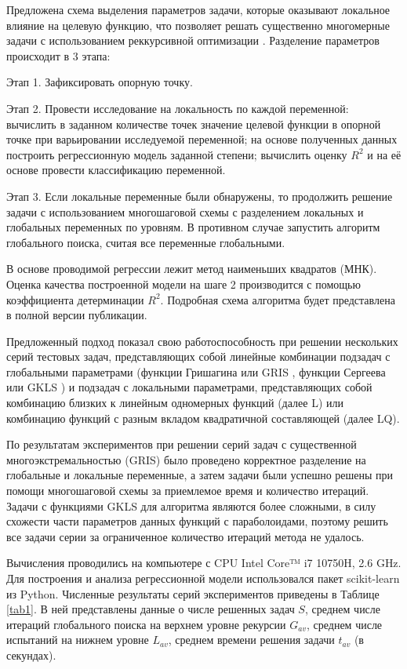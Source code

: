 \documentclass[11pt, oneside, a4paper]{article}
\begin{document}
Предложена схема выделения параметров задачи, которые оказывают локальное влияние на целевую функцию, что позволяет решать существенно многомерные задачи с использованием реккурсивной оптимизации \cite{Carr}. Разделение параметров происходит в 3 этапа:

Этап 1. Зафиксировать опорную точку. 

Этап 2. Провести исследование на локальность по каждой переменной: вычислить в заданном количестве точек значение целевой функции в опорной точке при варьировании исследуемой переменной; на основе полученных данных построить регрессионную модель заданной степени; вычислить оценку $R^2$ и на её основе провести классификацию переменной.

Этап 3. Если локальные переменные были обнаружены, то продолжить решение задачи с использованием многошаговой схемы с разделением локальных и глобальных переменных по уровням. В противном случае запустить алгоритм глобального поиска, считая все переменные глобальными.

В основе проводимой регрессии лежит метод наименьших квадратов (МНК). Оценка качества построенной модели на шаге 2 производится с помощью коэффициента детерминации $R^2$. Подробная схема алгоритма будет представлена в полной версии публикации.

Предложенный подход показал свою работоспособность при решении нескольких серий тестовых задач, представляющих собой линейные комбинации подзадач с глобальными параметрами (функции Гришагина или GRIS \cite{Grishagin1994}, функции Сергеева или GKLS \cite{Sergeyev2015,Grishagin2018}) и подзадач с локальными параметрами, представляющих собой комбинацию близких к линейным одномерных функций (далее L) или  комбинацию  функций с разным вкладом квадратичной составляющей (далее LQ).

По результатам экспериментов при решении серий задач с существенной многоэкстремальностью (GRIS) было проведено корректное разделение на глобальные и локальные переменные, а затем задачи были успешно решены при помощи многошаговой схемы за приемлемое время и количество итераций. Задачи с функциями  GKLS для алгоритма являются более сложными, в силу схожести части параметров данных функций с параболоидами, поэтому решить все задачи серии за ограниченное количество итераций метода не удалось.

Вычисления проводились на компьютере с CPU Intel Core™ i7 10750H, 2.6 GHz. Для построения и анализа регрессионной модели использовался пакет scikit-learn из Python.
Численные результаты серий экспериментов приведены в Таблице \ref{tab1}.
В ней представлены данные о числе решенных задач $S$, среднем числе итераций глобального поиска на верхнем уровне рекурсии $G_{av}$, среднем числе испытаний на нижнем уровне $L_{av}$, среднем времени решения задачи $t_{av}$ (в секундах).
\end{document}
